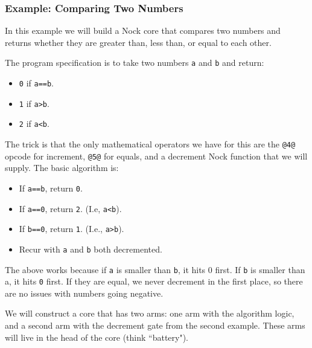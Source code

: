 \documentclass[twoside]{article}
\begin{document}
\subsubsection{Example:  Comparing Two Numbers}

In this example we will build a Nock core that compares two numbers and returns whether they are greater than, less than, or equal to each other.

The program specification is to take two numbers \lstinline[style=inlinecode]{a} and \lstinline[style=inlinecode]{b} and return:

\begin{itemize}
  \item  \lstinline[style=inlinecode]{0} if \lstinline[style=inlinecode]{a==b}.
  \item  \lstinline[style=inlinecode]{1} if \lstinline[style=inlinecode]{a>b}.
  \item  \lstinline[style=inlinecode]{2} if \lstinline[style=inlinecode]{a<b}.
\end{itemize}

The trick is that the only mathematical operators we have for this are the \lstinline[style=inlinecode]{@4@} opcode for increment, \lstinline[style=inlinecode]{@5@} for equals, and a decrement Nock function that we will supply.  The basic algorithm is:

\begin{itemize}
  \item  If \lstinline[style=inlinecode]{a==b}, return \lstinline[style=inlinecode]{0}.
  \item  If \lstinline[style=inlinecode]{a==0}, return \lstinline[style=inlinecode]{2}.  (I.e, \lstinline[style=inlinecode]{a<b}).
  \item  If \lstinline[style=inlinecode]{b==0}, return \lstinline[style=inlinecode]{1}.  (I.e., \lstinline[style=inlinecode]{a>b}).
  \item  Recur with \lstinline[style=inlinecode]{a} and \lstinline[style=inlinecode]{b} both decremented.
\end{itemize}

The above works because if \lstinline[style=inlinecode]{a} is smaller than \lstinline[style=inlinecode]{b}, it hits 0 first. If \lstinline[style=inlinecode]{b} is smaller than a, it hits \lstinline[style=inlinecode]{0} first. If they are equal, we never decrement in the first place, so there are no issues with numbers going negative.

We will construct a core that has two arms: one arm with the algorithm logic, and a second arm with the decrement gate from the second example. These arms will live in the head of the core (think ``battery").
\end{document}

